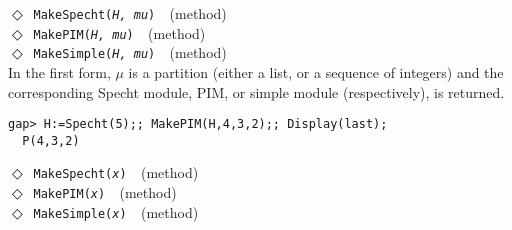 \documentclass[a4paper,11pt]{report}
\begin{document}
{{{ \noindent\textcolor{FuncColor}{$\Diamond$\ \texttt{MakeSpecht({\slshape H, mu})
\label{MakeSpecht}
}\hfill{\scriptsize (method)}}\\
\noindent\textcolor{FuncColor}{$\Diamond$\ \texttt{MakePIM({\slshape H, mu})
\label{MakePIM}
}\hfill{\scriptsize (method)}}\\
\noindent\textcolor{FuncColor}{$\Diamond$\ \texttt{MakeSimple({\slshape H, mu})
\label{MakeSimple}
}\hfill{\scriptsize (method)}}\\


 In the first form, $\mu$ is a partition (either a list, or a sequence of integers) and the
corresponding Specht module, PIM, or simple module (respectively), is
returned. 
\begin{Verbatim}[fontsize=\small,frame=single,label=Example]
  gap> H:=Specht(5);; MakePIM(H,4,3,2);; Display(last);
  P(4,3,2)
\end{Verbatim}


 \noindent\textcolor{FuncColor}{$\Diamond$\ \texttt{MakeSpecht({\slshape x})
\label{MakeSpecht:for a module}
}\hfill{\scriptsize (method)}}\\
\noindent\textcolor{FuncColor}{$\Diamond$\ \texttt{MakePIM({\slshape x})
\label{MakePIM:for a module}
}\hfill{\scriptsize (method)}}\\
\noindent\textcolor{FuncColor}{$\Diamond$\ \texttt{MakeSimple({\slshape x})
\label{MakeSimple:for a module}
}\hfill{\scriptsize (method)}}\\


}}}
\end{document}
